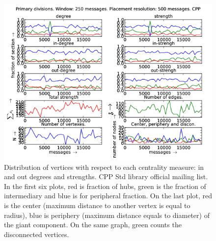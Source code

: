 \documentclass[%
 aip,
 jmp,%
 amsmath,amssymb,
 reprint,%
]{revtex4-1}
\begin{document}
\begin{figure}[hbtp] 
   \centering
        \includegraphics[width=\textwidth]{figs/CPP/250}
    \caption{Distribution of vertices with respect to each centrality measure: in and out degrees and strengths. CPP Std library official mailing list. In the first six plots, red is fraction of hubs, green is the fraction of intermediary and blue is for peripheral fraction. On the last plot, red is the center (maximum distance to another vertex is equal to radius), blue is periphery (maximum distance equals to diameter) of the giant component. On the same graph, green counts the disconnected vertices.}
    \label{fig:cpp250}
\end{figure}
\end{document}
